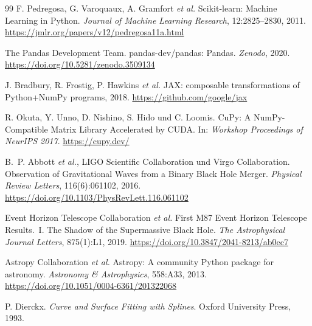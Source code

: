 \documentclass[12pt, a4paper]{article}
\begin{document}
\begin{thebibliography}{99}
F. Pedregosa, G. Varoquaux, A. Gramfort \textit{et al.}
Scikit-learn: Machine Learning in Python.
\textit{Journal of Machine Learning Research}, 12:2825--2830, 2011.
\url{https://jmlr.org/papers/v12/pedregosa11a.html}

The Pandas Development Team.
pandas-dev/pandas: Pandas.
\textit{Zenodo}, 2020.
\url{https://doi.org/10.5281/zenodo.3509134}


J. Bradbury, R. Frostig, P. Hawkins \textit{et al.}
{JAX}: composable transformations of {Python}+{NumPy} programs, 2018.
\url{https://github.com/google/jax}

R. Okuta, Y. Unno, D. Nishino, S. Hido und C. Loomis.
{CuPy}: A {NumPy}-Compatible Matrix Library Accelerated by {CUDA}.
In: \textit{Workshop Proceedings of NeurIPS 2017}.
\url{https://cupy.dev/}


B.~P. Abbott \textit{et al.}, LIGO Scientific Collaboration und Virgo
Collaboration.
Observation of Gravitational Waves from a Binary Black Hole Merger.
\textit{Physical Review Letters}, 116(6):061102, 2016.
\url{https://doi.org/10.1103/PhysRevLett.116.061102}

Event Horizon Telescope Collaboration \textit{et al.}
First {M87} Event Horizon Telescope Results.~{I}. The Shadow of the
Supermassive Black Hole.
\textit{The Astrophysical Journal Letters}, 875(1):L1, 2019.
\url{https://doi.org/10.3847/2041-8213/ab0ec7}

Astropy Collaboration \textit{et al.}
Astropy: A community Python package for astronomy.
\textit{Astronomy \& Astrophysics}, 558:A33, 2013.
\url{https://doi.org/10.1051/0004-6361/201322068}


P. Dierckx.
\textit{Curve and Surface Fitting with Splines}.
Oxford University Press, 1993.


\end{thebibliography}
\end{document}
